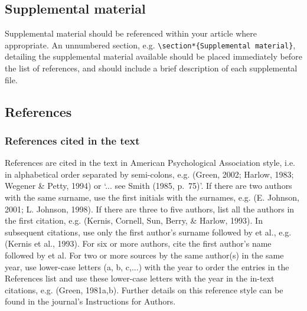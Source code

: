 \documentclass{nCSE2e}
\begin{document}
\subsection{Supplemental material}

Supplemental material should be referenced within your article where appropriate. An unnumbered section, e.g. \verb"\section*{Supplemental material}", detailing the supplemental material available should be placed immediately before the list of references, and should include a brief description of each supplemental file.


\subsection{References}\label{refs}

\subsubsection{References cited in the text}

References are cited in the text in American Psychological Association style, i.e. in alphabetical order separated by semi-colons, e.g. (Green, 2002; Harlow, 1983; Wegener \& Petty, 1994) or `... see Smith (1985, p.~75)'. If there are two authors with the same surname, use the first initials with the surnames, e.g. (E. Johnson, 2001; L. Johnson, 1998). If there are three to five authors, list all the authors in the first citation, e.g. (Kernis, Cornell, Sun, Berry, \& Harlow, 1993). In subsequent citations, use only the first author's surname followed by et al., e.g. (Kernis et al., 1993). For six or more authors, cite the first author's name followed by et al. For two or more sources by the same author(s) in the same year, use lower-case letters (a, b, c,...) with the year to order the entries in the References list and use these lower-case letters with the year in the in-text citations, e.g. (Green, 1981a,b). Further details on this reference style can be found in the journal's Instructions for Authors.
\end{document}

